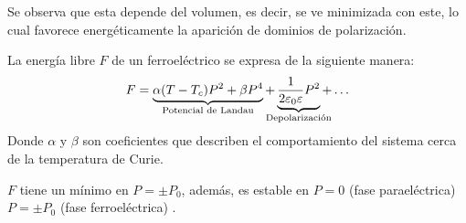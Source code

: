 \documentclass[../main.tex]{subfiles}
\begin{document}
Se observa que esta depende del volumen, es decir, se ve minimizada con este, lo cual favorece energéticamente la aparición de dominios de polarización.

La energía libre $F$ de un ferroeléctrico se expresa de la siguiente manera:
\begin{equation}
    F=\underbrace{\alpha(T-T_c)P^2+\beta P^4}_\text{\clap{Potencial de Landau}}+\underbrace{\dfrac{1}{2\varepsilon_0\varepsilon}P^2}_\text{\clap{Depolarización}}+\dots
    \label{eq:energíalibre}
\end{equation}
Donde $\alpha$ y $\beta$ son coeficientes que describen el comportamiento del sistema cerca de la temperatura de Curie.

$F$ tiene un mínimo en $P=\pm P_{0}$, además, es estable en $P=0$ (fase paraeléctrica) $P=\pm P_{0}$ (fase ferroeléctrica) \cite{Landau1984}.
\end{document}
